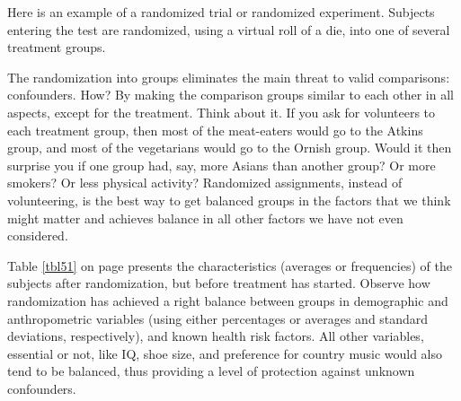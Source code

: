 \documentclass[11pt, chapterprefix=true]{scrbook}\usepackage[]{graphicx}\usepackage[]{color}
\begin{document}
Here is an example of a randomized trial or randomized experiment.   Subjects entering the test are randomized, using a virtual roll of a die, into one of several treatment groups.

The randomization into groups eliminates the main threat to valid comparisons: \\ confounders.  How?  By making the comparison groups similar to each other in all aspects, except for the treatment.  Think about it.  If you ask for volunteers to each treatment group, then most of the meat-eaters would go to the Atkins group, and most of the vegetarians would go to the Ornish group.   Would it then surprise you if one group had, say, more Asians than another group?  Or more smokers?  Or less physical activity?  Randomized assignments, instead of volunteering, is the best way to get balanced groups in the factors that we think might matter and achieves balance in all other factors we have not even considered.

Table \ref{tbl51} on page \pageref{tbl51} presents the characteristics (averages or frequencies) of the subjects after randomization, but before treatment has started.  Observe how randomization has achieved a right balance between groups in demographic and anthropometric variables (using either percentages or averages and standard deviations, respectively), and known health risk factors.  All other variables, essential or not, like IQ, shoe size, and preference for country music would also tend to be balanced, thus providing a level of protection against unknown confounders.

\end{document}
